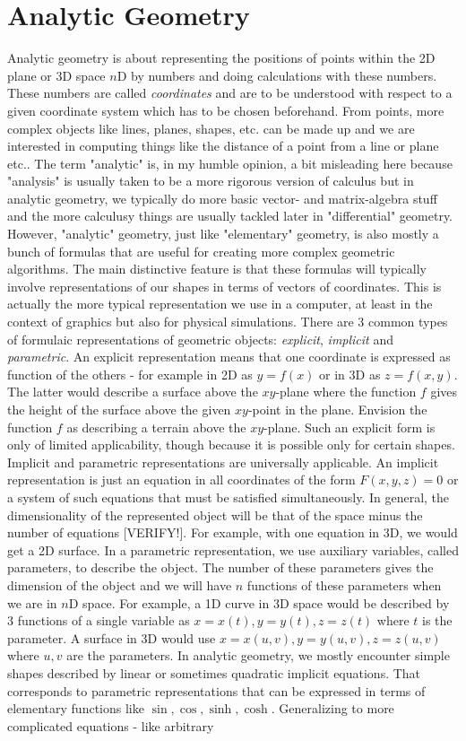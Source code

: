 \section{Analytic Geometry}
Analytic geometry is about representing the positions of points within the 2D plane or 3D space $n$D by numbers and doing calculations with these numbers. These numbers are called \emph{coordinates} and are to be understood with respect to a given coordinate system which has to be chosen beforehand. From points, more complex objects like lines, planes, shapes, etc. can be made up and we are interested in computing things like the distance of a point from a line or plane etc.. The term "analytic" is, in my humble opinion, a bit misleading here because "analysis" is usually taken to be a more rigorous version of calculus but in analytic geometry, we typically do more basic vector- and matrix-algebra stuff and the more calculusy things are usually tackled later in "differential" geometry. However, "analytic" geometry, just like "elementary" geometry, is also mostly a bunch of formulas that are useful for creating more complex geometric algorithms. The main distinctive feature is that these formulas will typically involve representations of our shapes in terms of vectors of coordinates. This is actually the more typical representation we use in a computer, at least in the context of graphics but also for physical simulations. There are 3 common types of formulaic representations of geometric objects: \emph{explicit}, \emph{implicit} and \emph{parametric}. An explicit representation means that one coordinate is expressed as function of the others - for example in 2D as $y = f(x)$ or in 3D as $z = f(x,y)$. The latter would describe a surface above the $xy$-plane where the function $f$ gives the height of the surface above the given $xy$-point in the plane. Envision the function $f$ as describing a terrain above the $xy$-plane. Such an explicit form is only of limited applicability, though because it is possible only for certain shapes. Implicit and parametric representations are universally applicable. An implicit representation is just an equation in all coordinates of the form $F(x,y,z) = 0$ or a system of such equations that must be satisfied simultaneously. In general, the dimensionality of the represented object will be that of the space minus the number of equations [VERIFY!]. For example, with one equation in 3D, we would get a 2D surface. In a parametric representation, we use auxiliary variables, called parameters, to describe the object. The number of these parameters gives the dimension of the object and we will have $n$ functions of these parameters when we are in $n$D space. For example, a 1D curve in 3D space would be described by 3 functions of a single variable as $x = x(t), y = y(t), z = z(t)$ where $t$ is the parameter. A surface in 3D would use $x = x(u,v), y = y(u,v), z = z(u,v)$ where $u,v$ are the parameters. In analytic geometry, we mostly encounter simple shapes described by linear or sometimes quadratic implicit equations. That corresponds to parametric representations that can be expressed in terms of elementary functions like $\sin, \cos, \sinh, \cosh$. Generalizing to more complicated equations - like arbitrary 